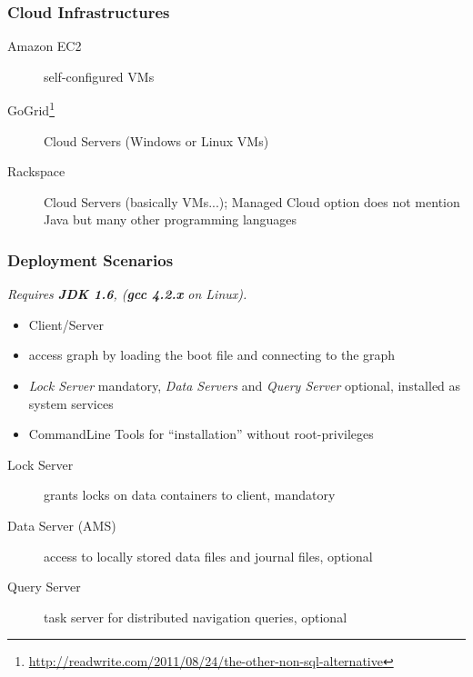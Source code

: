 
\subsubsection{Cloud Infrastructures} %
\label{ssub:supported_cloud_infrastructures}

\begin{description}
	\item[Amazon EC2]
		self-configured VMs
	\item[GoGrid\footnote{\url{http://readwrite.com/2011/08/24/the-other-non-sql-alternative}}]
		Cloud Servers (Windows or Linux VMs)
	\item[Rackspace]
		Cloud Servers (basically VMs...);
		Managed Cloud option does not mention Java but many other programming languages
\end{description}


\subsubsection{Deployment Scenarios} %
\label{ssub:deployment_scenarios}

\emph{Requires \textbf{JDK 1.6}, (\textbf{gcc 4.2.x} on Linux).}

\begin{itemize}
	\item Client/Server
	\item access graph by loading the boot file and connecting to the graph
	\item
		\emph{Lock Server} mandatory,
		\emph{Data Servers} and \emph{Query Server} optional,
		installed as system services

	\item CommandLine Tools for ``installation'' without root-privileges
\end{itemize}

\begin{description}
	\item[Lock Server] grants locks on data containers to client,
	mandatory
	\item[Data Server (AMS)] access to locally stored data files and journal files,
	optional
	\item[Query Server] task server for distributed navigation queries,
	optional
\end{description}

